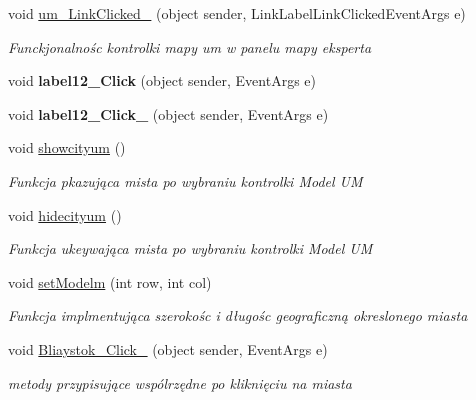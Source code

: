 \begin{DoxyCompactItemize}
void \mbox{\hyperlink{class_pogodynka__w57003_1_1panel__glony_ac50b569c9ce770f430f4d644bc758d51}{um\+\_\+\+Link\+Clicked\+\_}} (object sender, Link\+Label\+Link\+Clicked\+Event\+Args e)
\begin{DoxyCompactList}\small\item\em Funckjonalnośc kontrolki mapy um w panelu mapy eksperta \end{DoxyCompactList}\item 
\mbox{\label{class_pogodynka__w57003_1_1panel__glony_a1fbfdc80359bf8836628c39abc48ec14}} 
void {\bfseries label12\+\_\+\+Click} (object sender, Event\+Args e)
\item 
\mbox{\label{class_pogodynka__w57003_1_1panel__glony_a818f89ab7880da12e9bab877186c43ea}} 
void {\bfseries label12\+\_\+\+Click\+\_} (object sender, Event\+Args e)
\item 
void \mbox{\hyperlink{class_pogodynka__w57003_1_1panel__glony_a58881a0fcdaac088f2ba3108cd62db63}{showcityum}} ()
\begin{DoxyCompactList}\small\item\em Funkcja pkazująca mista po wybraniu kontrolki Model UM \end{DoxyCompactList}\item 
void \mbox{\hyperlink{class_pogodynka__w57003_1_1panel__glony_a0548ec7f9130fc67e27ad426e0cb79da}{hidecityum}} ()
\begin{DoxyCompactList}\small\item\em Funkcja ukeywająca mista po wybraniu kontrolki Model UM \end{DoxyCompactList}\item 
void \mbox{\hyperlink{class_pogodynka__w57003_1_1panel__glony_af58e72c559c60a71a859212c03f33f69}{set\+Modelm}} (int row, int col)
\begin{DoxyCompactList}\small\item\em Funkcja implmentująca szerokośc i długośc geograficzną okreslonego miasta \end{DoxyCompactList}\item 
void \mbox{\hyperlink{class_pogodynka__w57003_1_1panel__glony_a75827f3c30a1c8dc76f94ff41e1427dc}{Bliaystok\+\_\+\+Click\+\_}} (object sender, Event\+Args e)
\begin{DoxyCompactList}\small\item\em metody przypisujące wspólrzędne po kliknięciu na miasta \end{DoxyCompactList}\item 

\end{DoxyCompactItemize}
